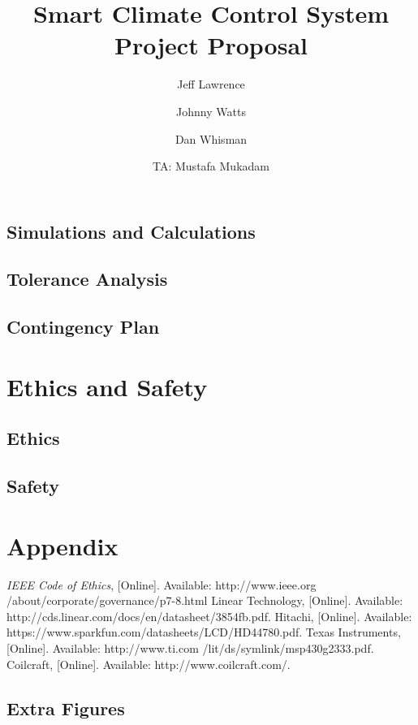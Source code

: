 \documentclass[draft,titlepage]{article}
\title{Smart Climate Control System\\Project Proposal}
\author{Jeff Lawrence
   \and Johnny Watts
   \and Dan Whisman
   \and TA: Mustafa Mukadam}
\begin{document}
\maketitle

\setcounter{secnumdepth}{5}

\tableofcontents







\subsection{Simulations and Calculations}




\subsection{Tolerance Analysis}



\subsection{Contingency Plan}

\section{Ethics and Safety}
\subsection{Ethics}
\subsection{Safety}

\section{Appendix}
\begin{thebibliography}{10}
	\textit{IEEE Code of Ethics}, [Online]. Available: http://www.ieee.org /about/corporate/governance/p7-8.html
	Linear Technology, [Online]. Available: http://cds.linear.com/docs/en/datasheet/3854fb.pdf.
	Hitachi, [Online]. Available: https://www.sparkfun.com/datasheets/LCD/HD44780.pdf.
	Texas Instruments, [Online]. Available: http://www.ti.com /lit/ds/symlink/msp430g2333.pdf.
	Coilcraft, [Online]. Available: http://www.coilcraft.com/.

\end{thebibliography}
\subsection{Extra Figures}
\end{document}
